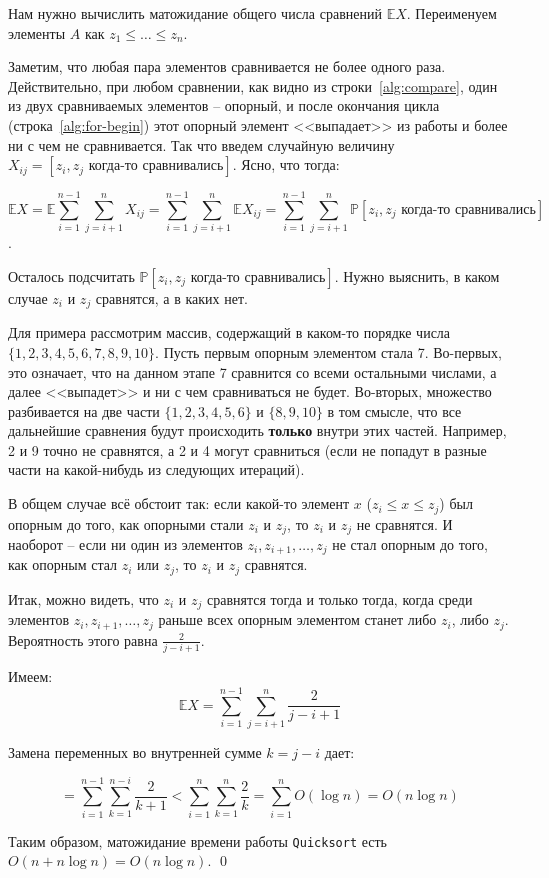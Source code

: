 Нам нужно вычислить матожидание общего числа сравнений $\mathbb E X$. Переименуем элементы $A$ как $z_1 \leq \ldots \leq z_n$.

Заметим, что любая пара элементов сравнивается не более одного раза. Действительно, при любом сравнении, как видно из строки~\ref{alg:compare}, один из двух сравниваемых элементов -- опорный, и после окончания цикла (строка~\ref{alg:for-begin}) этот опорный элемент <<выпадает>> из работы и более ни с чем не сравнивается. Так что введем случайную величину $X_{ij} = [z_i, z_j \text{ когда-то сравнивались}]$. Ясно, что тогда:

$$\mathbb E X = \mathbb E \sum_{i=1}^{n-1} \sum_{j=i+1}^n X_{ij} = \sum_{i=1}^{n-1} \sum_{j=i+1}^n \mathbb E X_{ij} = \sum_{i=1}^{n-1} \sum_{j=i+1}^n \mathbb P[z_i, z_j \text{ когда-то сравнивались}]$$.

Осталось подсчитать $\mathbb P[z_i, z_j\text{ когда-то сравнивались}]$. Нужно выяснить, в каком случае $z_i$ и $z_j$ сравнятся, а в каких нет.

Для примера рассмотрим массив, содержащий в каком-то порядке числа $\{1,2,3,4,5,6,7,8,9,10\}$. Пусть первым опорным элементом стала 7. Во-первых, это означает, что на данном этапе 7 сравнится со всеми остальными числами, а далее <<выпадет>> и ни с чем сравниваться не будет. Во-вторых, множество разбивается на две части $\{1,2,3,4,5,6\}$ и $\{8,9,10\}$ в том смысле, что все дальнейшие сравнения будут происходить \textbf{только} внутри этих частей. Например, 2 и 9 точно не сравнятся, а 2 и 4 могут сравниться (если не попадут в разные части на какой-нибудь из следующих итераций). 

В общем случае всё обстоит так: если какой-то элемент $x$ ($z_i \leq x \leq z_j$) был опорным до того, как опорными стали $z_i$ и $z_j$, то $z_i$ и $z_j$ не сравнятся. И наоборот -- если ни один из элементов $z_i, z_{i+1},\ldots, z_j$ не стал опорным до того, как опорным стал $z_i$ или $z_j$, то $z_i$ и $z_j$ сравнятся.

Итак, можно видеть, что $z_i$ и $z_j$ сравнятся тогда и только тогда, когда среди элементов $z_i, z_{i+1}, \ldots, z_j$ раньше всех опорным элементом станет либо $z_i$, либо $z_j$. Вероятность этого равна $\frac{2}{j-i+1}$.

Имеем: $$\mathbb E X = \sum_{i=1}^{n-1} \sum_{j=i+1}^n \frac{2}{j-i+1}$$

Замена переменных во внутренней сумме $k = j-i$ дает:

$$ = \sum_{i=1}^{n-1} \sum_{k=1}^{n-i} \frac{2}{k+1} < \sum_{i=1}^n \sum_{k=1}^n \frac{2}{k} = \sum_{i=1}^n O(\log n) = O(n \log n)$$

Таким образом, матожидание времени работы \texttt{Quicksort} есть $O(n+n\log n) = O(n\log n)$. \qed
